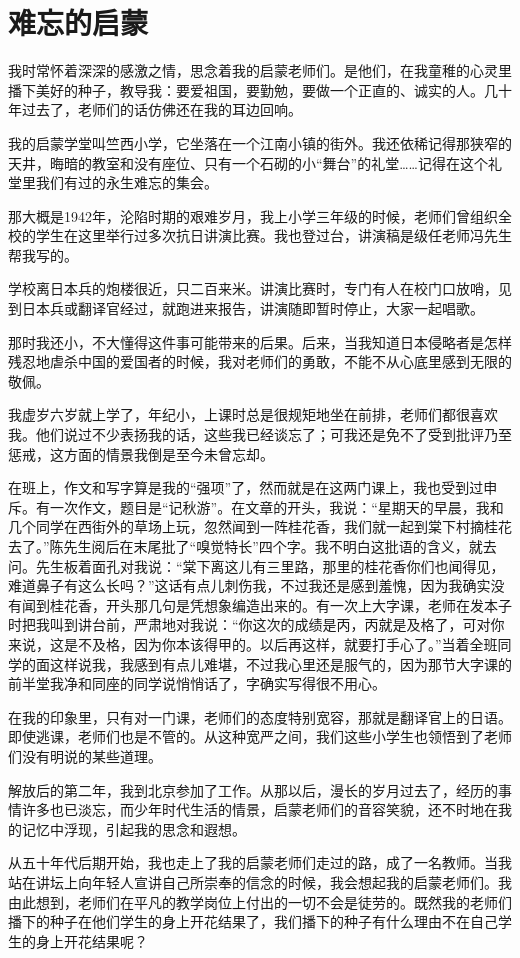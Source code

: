 \documentclass[12pt,UTF-8,openany]{ctexbook}
\begin{document}
\chapter{难忘的启蒙}

\begin{large}
    
    我时常怀着深深的感激之情，思念着我的启蒙老师们。是他们，在我童稚的心灵里播下美好的种子，教导我：要爱祖国，要勤勉，要做一个正直的、诚实的人。几十年过去了，老师们的话仿佛还在我的耳边回响。
    
    我的启蒙学堂叫竺西小学，它坐落在一个江南小镇的街外。我还依稀记得那狭窄的天井，晦暗的教室和没有座位、只有一个石砌的小“舞台”的礼堂……记得在这个礼堂里我们有过的永生难忘的集会。
    
    那大概是1942年，沦陷时期的艰难岁月，我上小学三年级的时候，老师们曾组织全校的学生在这里举行过多次抗日讲演比赛。我也登过台，讲演稿是级任老师冯先生帮我写的。
    
    学校离日本兵的炮楼很近，只二百来米。讲演比赛时，专门有人在校门口放哨，见到日本兵或翻译官经过，就跑进来报告，讲演随即暂时停止，大家一起唱歌。
    
    那时我还小，不大懂得这件事可能带来的后果。后来，当我知道日本侵略者是怎样残忍地虐杀中国的爱国者的时候，我对老师们的勇敢，不能不从心底里感到无限的敬佩。
    
    我虚岁六岁就上学了，年纪小，上课时总是很规矩地坐在前排，老师们都很喜欢我。他们说过不少表扬我的话，这些我已经谈忘了；可我还是免不了受到批评乃至惩戒，这方面的情景我倒是至今未曾忘却。
    
    在班上，作文和写字算是我的“强项”了，然而就是在这两门课上，我也受到过申斥。有一次作文，题目是“记秋游”。在文章的开头，我说：“星期天的早晨，我和几个同学在西街外的草场上玩，忽然闻到一阵桂花香，我们就一起到棠下村摘桂花去了。”陈先生阅后在末尾批了“嗅觉特长”四个字。我不明白这批语的含义，就去问。先生板着面孔对我说：“棠下离这儿有三里路，那里的桂花香你们也闻得见，难道鼻子有这么长吗？”这话有点儿刺伤我，不过我还是感到羞愧，因为我确实没有闻到桂花香，开头那几句是凭想象编造出来的。有一次上大字课，老师在发本子时把我叫到讲台前，严肃地对我说：“你这次的成绩是丙，丙就是及格了，可对你来说，这是不及格，因为你本该得甲的。以后再这样，就要打手心了。”当着全班同学的面这样说我，我感到有点儿难堪，不过我心里还是服气的，因为那节大字课的前半堂我净和同座的同学说悄悄话了，字确实写得很不用心。
    
    在我的印象里，只有对一门课，老师们的态度特别宽容，那就是翻译官上的日语。即使逃课，老师们也是不管的。从这种宽严之间，我们这些小学生也领悟到了老师们没有明说的某些道理。
    
    解放后的第二年，我到北京参加了工作。从那以后，漫长的岁月过去了，经历的事情许多也已淡忘，而少年时代生活的情景，启蒙老师们的音容笑貌，还不时地在我的记忆中浮现，引起我的思念和遐想。
    
    从五十年代后期开始，我也走上了我的启蒙老师们走过的路，成了一名教师。当我站在讲坛上向年轻人宣讲自己所崇奉的信念的时候，我会想起我的启蒙老师们。我由此想到，老师们在平凡的教学岗位上付出的一切不会是徒劳的。既然我的老师们播下的种子在他们学生的身上开花结果了，我们播下的种子有什么理由不在自己学生的身上开花结果呢？
    
\end{large}
\end{document}
